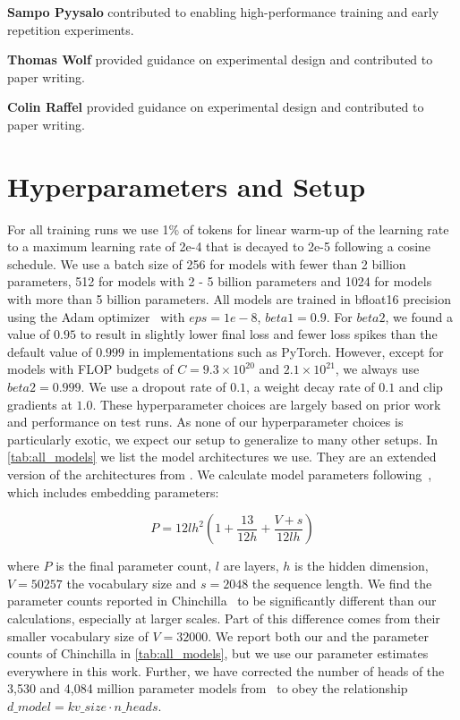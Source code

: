 \documentclass{article}
\begin{document}
\textbf{Sampo Pyysalo} contributed to enabling high-performance training and early repetition experiments.

\textbf{Thomas Wolf} provided guidance on experimental design and contributed to paper writing.

\textbf{Colin Raffel} provided guidance on experimental design and contributed to paper writing.

\FloatBarrier

\section{Hyperparameters and Setup}
\label{sec:arch}

For all training runs we use 1\% of tokens for linear warm-up of the learning rate to a maximum learning rate of 2e-4 that is decayed to 2e-5 following a cosine schedule. We use a batch size of 256 for models with fewer than 2 billion parameters, 512 for models with 2 - 5 billion parameters and 1024 for models with more than 5 billion parameters. All models are trained in bfloat16 precision using the Adam optimizer~\cite{kingma2014adam} with $eps=1e-8$, $beta1=0.9$. For $beta2$, we found a value of $0.95$ to result in slightly lower final loss and fewer loss spikes than the default value of $0.999$ in implementations such as PyTorch. However, except for models with FLOP budgets of $C=9.3 \times 10^{20}$ and $2.1 \times 10^{21}$, we always use $beta2=0.999$. We use a dropout rate of $0.1$, a weight decay rate of $0.1$ and clip gradients at $1.0$. These hyperparameter choices are largely based on prior work~\cite{hoffmann2022training,touvron2023llama} and performance on test runs. As none of our hyperparameter choices is particularly exotic, we expect our setup to generalize to many other setups. In \autoref{tab:all_models} we list the model architectures we use. They are an extended version of the architectures from \cite{hoffmann2022training}. We calculate model parameters following~\cite{narayanan2021efficient}, which includes embedding parameters:

\begin{equation}
  P = 12lh^2\left(1 + \dfrac{13}{12h}+\dfrac{V+s}{12lh}\right)
  \label{eq:num-params}
\end{equation}

where $P$ is the final parameter count, $l$ are layers, $h$ is the hidden dimension, $V=50257$ the vocabulary size and $s=2048$ the sequence length. We find the parameter counts reported in Chinchilla~\cite{hoffmann2022training} to be significantly different than our calculations, especially at larger scales. Part of this difference comes from their smaller vocabulary size of $V=32000$.  We report both our and the parameter counts of Chinchilla in \autoref{tab:all_models}, but we use our 
parameter estimates everywhere in this work. Further, we have corrected the number of heads of the 3,530 and 4,084 million parameter models from~\cite{hoffmann2022training} to obey the relationship $d\_model=kv\_size \cdot n\_heads$.
\end{document}
